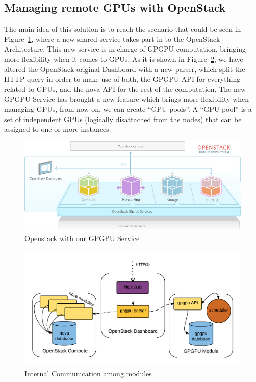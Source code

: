 \documentclass[a4paper,twoside]{article}
\begin{document}
\subsection{Managing remote GPUs with OpenStack}
The main idea of this solution is to reach the scenario that could be seen in Figure~\ref{fig:external}, where a new shared service takes part in to the OpenStack Architecture.
This new service is in charge of GPGPU computation, bringing more flexibility when it comes to GPUs.
As it is shown in Figure~\ref{fig:internal}, we have altered the OpenStack original Dashboard with a new parser, 
which split the HTTP query in order to make use of both, the GPGPU API for everything related to GPUs, and the nova API for the rest of the computation. 
The new GPGPU Service has brought a new feature which brings more flexibility when managing GPUs, from now on, we can create ``GPU-pools''. 
A ``GPU-pool'' is a set of independent GPUs (logically disattached from the nodes) that can be assigned to one or more instances.


\begin{figure}[!t]
  \centering
  \includegraphics[width=\linewidth]{images/os1.jpg}
  \caption{Openstack with our GPGPU Service}
  \label{fig:external}
\end{figure}

\begin{figure}[!t]
  \centering
  \includegraphics[width=\linewidth]{images/os2.png}
  \caption{Internal Communication among modules}
  \label{fig:internal}
\end{figure}
\end{document}

